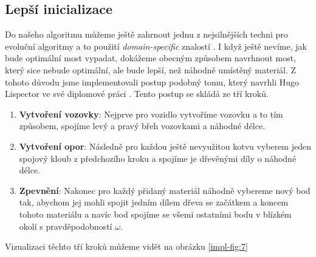 \subsection{Lepší inicializace}

Do našeho algoritmu můžeme ještě zahrnout jednu z nejsilnějších techni pro evoluční algoritmy a to použití \textit{domain-specific} znalostí \cite{PASSONE2006192}. I když ještě nevíme, jak bude optimální most vypadat, dokážeme obecným způsobem navrhnout most, který sice nebude optimální, ale bude lepší, než náhodně umístěný materiál. Z tohoto důvodu jsme implementovali postup podobný tomu, který navrhli Hugo Lispector ve své diplomové práci \cite{Lispector2022}. Tento postup se skládá ze tří kroků.

\begin{enumerate}
    \item \textbf{Vytvoření vozovky}: Nejprve pro vozidlo vytvoříme vozovku a to tím způsobem, spojíme levý a pravý břeh vozovkami a náhodné délce.
    \item \textbf{Vytvoření opor}: Následně pro každou ještě nevyužitou kotvu vyberem jeden spojový kloub z předchozího kroku a spojíme je dřevěnými díly o náhodné délce.
    \item \textbf{Zpevnění}: Nakonec pro každý přidaný materiál náhodně vybereme nový bod tak, abychom jej mohli spojit jedním dílem dřeva se začátkem a koncem tohoto materiálu a navíc bod spojíme se všemi ostatními bodu v blízkém okolí s pravděpodobností $\omega$.
\end{enumerate}

Vizualizaci těchto tří kroků můžeme vidět na obrázku \ref{impl-fig:7}

